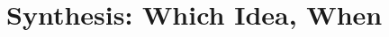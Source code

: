 \chapter{Synthesis: Which Idea, When}\label{ch:14}
\providecommand{\ThOcB}{}\renewcommand{\ThOcB}{4}
\providecommand{\ThOcN}{}\renewcommand{\ThOcN}{11}
\providecommand{\ThOcPexact}{}\renewcommand{\ThOcPexact}{0.00284}
\providecommand{\ThOcZ}{}\renewcommand{\ThOcZ}{2.77}
\providecommand{\ThOcPsim}{}\renewcommand{\ThOcPsim}{0.00282}
\providecommand{\ThOcPsimErr}{}\renewcommand{\ThOcPsimErr}{0.00004}
\providecommand{\ThOcNsim}{}\renewcommand{\ThOcNsim}{2\times10^{6}}
\providecommand{\ThOcShat}{}\renewcommand{\ThOcShat}{7}
\providecommand{\ThOcSigCurv}{}\renewcommand{\ThOcSigCurv}{3.32}
\providecommand{\ThOcLikLo}{}\renewcommand{\ThOcLikLo}{4.01}
\providecommand{\ThOcLikHi}{}\renewcommand{\ThOcLikHi}{10.66}
\providecommand{\ThOcPostMed}{}\renewcommand{\ThOcPostMed}{7.67}
\providecommand{\ThOcPostLo}{}\renewcommand{\ThOcPostLo}{4.61}
\providecommand{\ThOcPostHi}{}\renewcommand{\ThOcPostHi}{11.40}
\providecommand{\ThOcPostMean}{}\renewcommand{\ThOcPostMean}{8.01}
\providecommand{\ThOcZzero}{}\renewcommand{\ThOcZzero}{0.00192}
\providecommand{\ThOcZone}{}\renewcommand{\ThOcZone}{0.04983}
\providecommand{\ThOcBten}{}\renewcommand{\ThOcBten}{25.9}
\providecommand{\ThOcLRmax}{}\renewcommand{\ThOcLRmax}{62}
\providecommand{\ThOcSmax}{}\renewcommand{\ThOcSmax}{20}
\providecommand{\ThOcZA}{}\renewcommand{\ThOcZA}{2.87}
\providecommand{\ThOcKfive}{}\renewcommand{\ThOcKfive}{3.0}
\providecommand{\ThOcKthree}{}\renewcommand{\ThOcKthree}{1.09}
\providecommand{\ThPaTau}{}\renewcommand{\ThPaTau}{2}
\providecommand{\ThPaN}{}\renewcommand{\ThPaN}{4\times10^{6}}
\providecommand{\ThPaNsel}{}\renewcommand{\ThPaNsel}{61737}
\providecommand{\ThPaFracNull}{}\renewcommand{\ThPaFracNull}{0.322}
\providecommand{\ThPaFracErr}{}\renewcommand{\ThPaFracErr}{0.002}
\providecommand{\ThPaBzeroone}{}\renewcommand{\ThPaBzeroone}{0.481}
\providecommand{\ThPaPostNull}{}\renewcommand{\ThPaPostNull}{0.325}
\providecommand{\ThPaBbar}{}\renewcommand{\ThPaBbar}{2.46}
\providecommand{\ThPaSellkePost}{}\renewcommand{\ThPaSellkePost}{0.289}
\providecommand{\ThPbX}{}\renewcommand{\ThPbX}{-1.5}
\providecommand{\ThPbCIlo}{}\renewcommand{\ThPbCIlo}{-3.145}
\providecommand{\ThPbCIhi}{}\renewcommand{\ThPbCIhi}{0.145}
\providecommand{\ThPbPostInCI}{}\renewcommand{\ThPbPostInCI}{0.25}
\providecommand{\ThPbUpNinety}{}\renewcommand{\ThPbUpNinety}{0.97}
\providecommand{\ThPbCovZero}{}\renewcommand{\ThPbCovZero}{0.000}
\providecommand{\ThPbCovHalf}{}\renewcommand{\ThPbCovHalf}{0.924}
